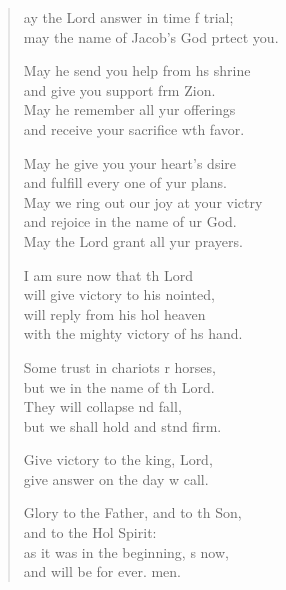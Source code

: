 \settowidth{\versewidth}{May we ring out our joy at your victory +}
\begin{verse}%
  \begin{patverse}
ay the Lord answer in time f trial;\Med\\
may the name of Jacob’s God prtect you.

May he send you help from h\pointup{\i}s shrine\Med\\
and give you support frm Zion.\\
May he remember all yur offerings\Med\\
and receive your sacrifice w\pointup{\i}th favor.

May he give you your heart’s dsire\Med\\
and fulfill every one of yur plans.\\
May we ring out our joy at your victry\Flex\\
and rejoice in the name of ur God.\Med\\
May the Lord grant all yur prayers.

I am sure now that th Lord\Med\\
will give victory to his nointed,\\
will reply from his hol heaven\Med\\
with the mighty victory of h\pointup{\i}s hand.

Some trust in chariots r horses,\Med\\
but we in the name of th Lord.\\
They will collapse nd fall,\Med\\
but we shall hold and stnd firm.

Give victory to the king,  Lord,\Med\\
give answer on the day w call.

Glory to the Father, and to th Son,\Med\\
and to the Hol Spirit:\\
as it was in the beginning, \pointup{\i}s now,\Med\\
and will be for ever. men.
  \end{patverse}
\end{verse}
